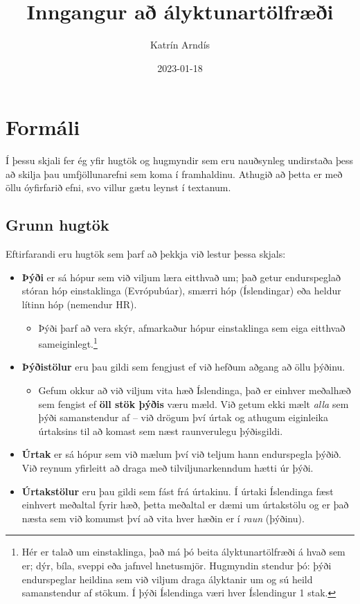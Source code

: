 \documentclass[
]{book}
\title{Inngangur að ályktunartölfræði}
\author{Katrín Arndís}
\date{2023-01-18}
\providecommand{\tightlist}{%
  \setlength{\itemsep}{0pt}\setlength{\parskip}{0pt}}
\begin{document}
\maketitle

{
\setcounter{tocdepth}{1}
\tableofcontents
}
\hypertarget{formuxe1li}{%
\chapter{Formáli}\label{formuxe1li}}

Í þessu skjali fer ég yfir hugtök og hugmyndir sem eru nauðsynleg
undirstaða þess að skilja þau umfjöllunarefni sem koma í framhaldinu.
Athugið að þetta er með öllu óyfirfarið efni, svo villur gætu leynst í
textanum.

\hypertarget{grunn-hugtuxf6k}{%
\section{Grunn hugtök}\label{grunn-hugtuxf6k}}

Eftirfarandi eru hugtök sem þarf að þekkja við lestur þessa skjals:

\begin{itemize}
\tightlist
\item
  \textbf{Þýði} er sá hópur sem við viljum læra eitthvað um; það getur
  endurspeglað stóran hóp einstaklinga (Evrópubúar), smærri hóp
  (Íslendingar) eða heldur lítinn hóp (nemendur HR).

  \begin{itemize}
  \tightlist
  \item
    Þýði þarf að vera skýr, afmarkaður hópur einstaklinga sem eiga
    eitthvað sameiginlegt.\footnote{Hér er talað um einstaklinga, það má þó beita
      ályktunartölfræði á hvað sem er; dýr, bíla, sveppi eða jafnvel
      hnetusmjör. Hugmyndin stendur þó: þýði endurspeglar heildina sem við
      viljum draga ályktanir um og sú heild samanstendur af stökum. Í þýði
      Íslendinga væri hver Íslendingur 1 stak.}
  \end{itemize}
\item
  \textbf{Þýðistölur} eru þau gildi sem fengjust ef við hefðum aðgang að
  öllu þýðinu.

  \begin{itemize}
  \tightlist
  \item
    Gefum okkur að við viljum vita hæð Íslendinga, það er einhver
    meðalhæð sem fengist ef \textbf{öll stök þýðis} væru mæld. Við getum
    ekki mælt \emph{alla} sem þýði samanstendur af -- við drögum því
    úrtak og athugum eiginleika úrtaksins til að komast sem næst
    raunverulegu þýðisgildi.
  \end{itemize}
\item
  \textbf{Úrtak} er sá hópur sem við mælum því við teljum hann endurspegla
  þýðið. Við reynum yfirleitt að draga með tilviljunarkenndum hætti úr
  þýði.
\item
  \textbf{Úrtakstölur} eru þau gildi sem fást frá úrtakinu. Í úrtaki
  Íslendinga fæst einhvert meðaltal fyrir hæð, þetta meðaltal er dæmi
  um úrtakstölu og er það næsta sem við komumst því að vita hver hæðin
  er í \emph{raun} (þýðinu).
\end{itemize}
\end{document}

